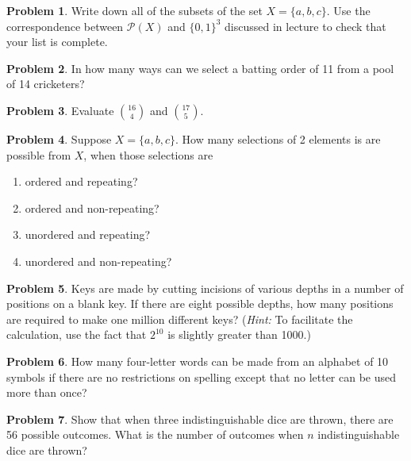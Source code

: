 \documentclass[12pt,a4paper]{article}
\numberwithin{equation}{section}
\theoremstyle{plain}
\theoremstyle{definition}
\newtheorem{problem}{Problem}
\newcommand{\Ps}{\mathcal P}
\begin{document}
\begin{problem}
	Write down all of the subsets of the set $X = \{a,b,c\}$. Use the correspondence between $\Ps(X)$ and $\{0,1\}^3$ discussed in lecture to check that your list is complete. 
\end{problem}

\begin{problem}
	In how many ways can we select a batting order of 11 from a pool of 14 cricketers? 
\end{problem}

\begin{problem}
	Evaluate $\binom{16}4$ and $\binom{17}5$. 
\end{problem}


\begin{problem}
	Suppose $X = \{a,b,c\}$. How many selections of 2 elements is are possible from $X$, when those selections are
	\begin{enumerate}[label=(\alph*)]
		\item ordered and repeating? 
		\item ordered and non-repeating?
		\item unordered and repeating? 
		\item unordered and non-repeating? 
	\end{enumerate}
\end{problem}

\begin{problem}
	Keys are made by cutting incisions of various depths in a number of positions on a blank key. If there are eight possible depths, how many positions are required to make one million different keys? (\emph{Hint:} To facilitate the calculation, use the fact that $2^{10}$ is slightly greater than 1000.) 
\end{problem}

\begin{problem}
	How many four-letter words can be made from an alphabet of 10 symbols if there are no restrictions on spelling except that no letter can be used more than once? 
\end{problem}

\begin{problem}
	Show that when three indistinguishable dice are thrown, there are 56 possible outcomes. What is the number of outcomes when $n$ indistinguishable dice are thrown?
\end{problem}
\end{document}
